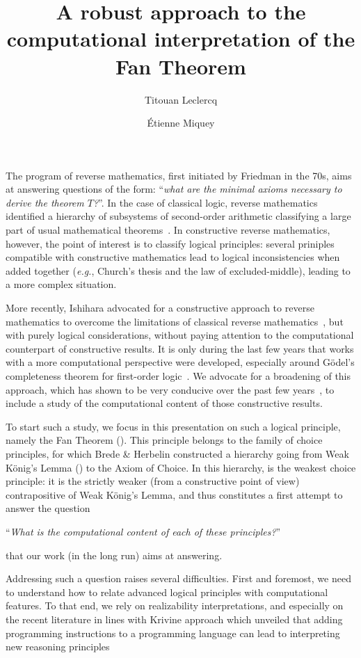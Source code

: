 \documentclass{easychair}
\title{A robust approach to the computational interpretation of the Fan Theorem}
\author{
  Titouan Leclercq\inst{1}
  \and
  \'Etienne Miquey\inst{2}
}
\institute{
  Aix-Marseille Universit{\'e}, Marseille, France\\
  \email{titouan.leclercq@univ-amu.fr},   \email{etienne.miquey@univ-amu.fr}
}
\begin{document}
\maketitle

The program of reverse mathematics, first initiated by Friedman in the 70s,
aims at answering questions of the form: ``\emph{what are the minimal axioms necessary to derive the theorem $T$?}''.
In the case of classical logic, reverse mathematics identified a hierarchy of subsystems of second-order arithmetic classifying a large part of usual mathematical theorems~\cite{Simpson09}. In constructive reverse mathematics, however, the point of interest is to classify logical principles: several priniples compatible with constructive mathematics lead to logical inconsistencies when added together (\emph{e.g.}, Church’s thesis and the law of excluded-middle), leading to a more complex situation.

More recently, Ishihara advocated for a constructive approach to reverse mathematics to overcome the limitations of classical reverse mathematics~\cite{Ishihara06}, but with
purely logical considerations, without paying attention to the computational counterpart of constructive results.
It is only during the last few years that works with a more computational perspective were developed, especially around Gödel's completeness theorem for first-order logic~\cite{HerIli22,ForKirWeh21}.
We advocate for a broadening of this approach, which has shown to be very conducive over the past few years~\cite{KirZen25,CohEtAl24,HerKir24,Bauer22}, to include a study of the computational content of those constructive results.


To start such a study, we focus in this presentation on such a logical principle, namely the Fan Theorem (\FT). This principle belongs to the family of choice principles, for which Brede \& Herbelin constructed a hierarchy going from Weak K\"onig's Lemma (\WKL) to the Axiom of Choice. In this hierarchy, \FT is the weakest choice principle: it is the strictly weaker (from a constructive point of view) contrapositive of Weak K\"onig's Lemma,
and thus constitutes a first attempt to answer the question
\begin{center}
 ``\emph{What is the computational content of each of these principles?}''
\end{center}
that our work (in the long run) aims at answering.

Addressing such a question raises several difficulties.
First and foremost, we need to understand how to relate advanced logical principles with computational features.
To that end, we rely on realizability interpretations, and especially on the recent literature in lines with Krivine approach which unveiled that adding programming instructions to a programming language can lead to interpreting new reasoning principles~\cite{Griffin90,Krivine04,Miquel11,Miquey18a,Geoffroy18,CohFarTat19,Blot22}
\end{document}
